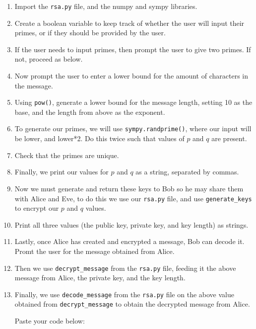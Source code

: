\documentclass{article}
\begin{document}
    \begin{enumerate}
        \item Import the \verb|rsa.py| file, and the numpy and sympy libraries.

        \item Create a boolean variable to keep track of whether the user will input their primes, or if they should be provided by the user.

        \item If the user needs to input primes, then prompt the user to give two primes. If not, proceed as below.

        \item Now prompt the user to enter a lower bound for the amount of characters in the message.

        \item Using \verb|pow()|, generate a lower bound for the message length, setting 10 as the base, and the length from above as the exponent.

        \item To generate our primes, we will use \verb|sympy.randprime()|, where our input will be lower, and lower*2. Do this twice such that values of $p$ and $q$ are present.

        \item Check that the primes are unique.

        \item Finally, we print our values for $p$ and $q$ as a string, separated by commas.

        \item Now we must generate and return these keys to Bob so he may share them with Alice and Eve, to do this we use our \verb|rsa.py| file, and use \verb|generate_keys| to encrypt our $p$ and $q$ values.

        \item Print all three values (the public key, private key, and key length) as strings.

        \item Lastly, once Alice has created and encrypted a message, Bob can decode it. Promt the user for the message obtained from Alice.

        \item Then we use \verb|decrypt_message| from the \verb|rsa.py| file, feeding it the above message from Alice, the private key, and the key length.

        \item Finally, we use \verb|decode_message| from the \verb|rsa.py| file on the above value obtained from \verb|decrypt_message| to obtain the decrypted message from Alice.

        Paste your code below:

            \TextField[width=6in,height=5in, bordercolor=0 0 0, name=bob2, multiline=true]{}
    \end{enumerate}
\end{document}
